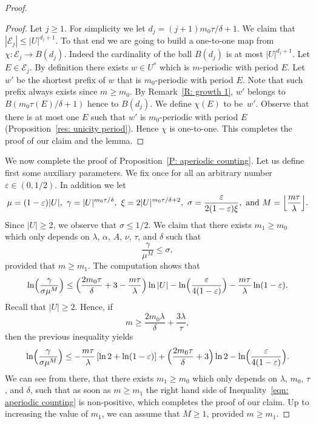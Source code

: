 \documentclass[11pt]{article}
\let\mathcal\mathscr
\let\epsilon\varepsilon
\theoremstyle{plain}
\theoremstyle{definition}
\begin{document}
\begin{proof}
\begin{proof}
Let $j \geq 1$.
For simplicity we let $d_j = (j+1)m_0\tau/\delta + 1$.
We claim that $| \mathcal E_j | \leq |U|^{d_j +1}$.
To that end we are going to build a one-to-one map from $\chi\colon\mathcal E_j \to B(d_j)$.
Indeed the cardinality of the ball $B(d_j)$ is at most $|U|^{d_j+1}$.
Let $E\in \mathcal{E}_j$.
By definition there exists $w \in U^*$ which is $m$-periodic with period $E$.
Let $w'$ be the shortest prefix of $w$ that is $m_0$-periodic with period $E$.
Note that such prefix always exists since $m\geq m_0$.
By Remark~\ref{R: growth 1}, $w'$ belongs to $B(m_0 \tau(E)/\delta+1)$ hence to $B(d_j)$.
We define $\chi(E)$ to be~$w'$.
Observe that there is at most one $E$ such that $w'$ is $m_0$-periodic with period $E$ (Proposition~\ref{res: unicity period}).
Hence $\chi$ is one-to-one.
This completes the proof of our claim and the lemma.
\end{proof}

We now complete the proof of Proposition~\ref{P: aperiodic counting}.
Let us define first some auxiliary parameters.
We fix once for all an arbitrary number $\epsilon \in (0,1/2)$.
In addition we let
\begin{equation*}
\mu = (1-\epsilon) |U|, \
\gamma = |U|^{m_0\tau/\delta}, \
\xi = 2 |U|^{m_0\tau/\delta + 2}, \
\sigma = \frac{ \epsilon}{2(1-\epsilon) \xi},
\ \text{and }
M = \Bigl\lfloor \frac{m\tau}\lambda \Bigr\rfloor.
\end{equation*}
Since $|U| \geq 2$, we observe that $\sigma \leq 1/2$.
We claim that there exists $m_1 \geq m_0$ which only depends on $\lambda$, $\alpha$, $A$, $\nu$, $\tau$, and $\delta$ such that
\begin{equation*}
\frac \gamma{\mu^M} \leq \sigma,
\end{equation*}
provided that $m \geq m_1$.
The computation shows that
\begin{equation*}
\ln \Bigl( \frac \gamma{\sigma \mu^M} \Bigr)
\leq \Bigl(\frac {2 m_0\tau}\delta + 3 - \frac {m\tau}\lambda\Bigr) \ln |U| - \ln\Bigl(\frac \epsilon {4(1-\epsilon)}\Bigr) - \frac {m\tau}\lambda \ln (1-\epsilon).
\end{equation*}
Recall that $|U| \geq 2$.
Hence, if
\begin{equation*}
m \geq \frac {2m_0\lambda}\delta + \frac{3\lambda}{\tau},
\end{equation*}
then the previous inequality yields
\begin{equation}
\label{eqn: aperiodic counting}
\ln \Bigl( \frac \gamma{\sigma \mu^M} \Bigr)
\leq - \frac{m\tau}\lambda \left[ \ln 2 + \ln (1 - \epsilon)\right] +
\Bigl(\frac {2 m_0\tau}\delta + 3 \Bigr) \ln 2 - \ln\Bigl(\frac \epsilon {4(1-\epsilon)}\Bigr).
\end{equation}
We can see from there, that there exists $m_1 \geq m_0$ which only depends on $\lambda$, $m_0$, $\tau$, and $\delta$, such that as soon as $m \geq m_1$ the right hand side of Inequality~\eqref{eqn: aperiodic counting} is non-positive, which completes the proof of our claim.
Up to increasing the value of $m_1$, we can assume that $M \geq 1$, provided $m \geq m_1$.


\end{proof}
\end{document}
